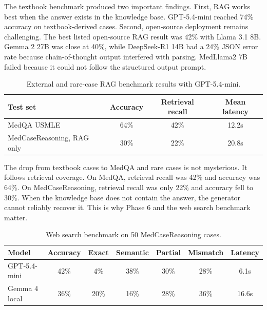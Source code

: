 The textbook benchmark produced two important findings. First, RAG works best when the answer exists in the knowledge base. GPT-5.4-mini reached 74\% accuracy on textbook-derived cases. Second, open-source deployment remains challenging. The best listed open-source RAG result was 42\% with Llama 3.1 8B. Gemma 2 27B was close at 40\%, while DeepSeek-R1 14B had a 24\% JSON error rate because chain-of-thought output interfered with parsing. MedLlama2 7B failed because it could not follow the structured output prompt.

\begin{table}[htbp]
\centering
\caption{External and rare-case RAG benchmark results with GPT-5.4-mini.}
\label{tab:external_rag_benchmark}
\begin{tabular}{p{} c c c}
\toprule
\textbf{Test set} & \textbf{Accuracy} & \textbf{Retrieval recall} & \textbf{Mean latency}\\
\midrule
MedQA USMLE & 64\% & 42\% & 12.2s\\
MedCaseReasoning, RAG only & 30\% & 22\% & 20.8s\\
\bottomrule
\end{tabular}
\end{table}

The drop from textbook cases to MedQA and rare cases is not mysterious. It follows retrieval coverage. On MedQA, retrieval recall was 42\% and accuracy was 64\%. On MedCaseReasoning, retrieval recall was only 22\% and accuracy fell to 30\%. When the knowledge base does not contain the answer, the generator cannot reliably recover it. This is why Phase 6 and the web search benchmark matter.

\begin{table}[htbp]
\centering
\caption{Web search benchmark on 50 MedCaseReasoning cases.}
\label{tab:web_search_benchmark}
\begin{tabular}{p{} c c c c c c}
\toprule
\textbf{Model} & \textbf{Accuracy} & \textbf{Exact} & \textbf{Semantic} & \textbf{Partial} & \textbf{Mismatch} & \textbf{Latency}\\
\midrule
GPT-5.4-mini & 42\% & 4\% & 38\% & 30\% & 28\% & 6.1s\\
Gemma 4 local & 36\% & 20\% & 16\% & 28\% & 36\% & 16.6s\\
\bottomrule
\end{tabular}
\end{table}

